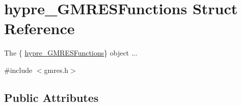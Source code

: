 \hypertarget{structhypre__GMRESFunctions}{}\section{hypre\+\_\+\+G\+M\+R\+E\+S\+Functions Struct Reference}
\label{structhypre__GMRESFunctions}


The \{ \hyperlink{structhypre__GMRESFunctions}{hypre\+\_\+\+G\+M\+R\+E\+S\+Functions}\} object ...  




{\ttfamily \#include $<$gmres.\+h$>$}

\subsection*{Public Attributes}

